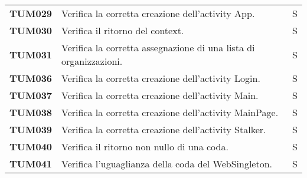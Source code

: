 \documentclass[../../piano-di-qualifica.tex]{subfiles}
\begin{document}
\begin{longtable}[H]{>{\centering\bfseries}m{3cm} >{}m{10cm} >{\centering\arraybackslash}m{3cm}}

  TUM029             & Verifica la corretta creazione dell'activity App.                                                                   & S                             \\ %

  TUM030             & Verifica il ritorno del context.                                                                                    & S                             \\ %

  TUM031             & Verifica la corretta assegnazione di una lista di organizzazioni.                                                   & S                             \\ %


  TUM036             & Verifica la corretta creazione dell'activity Login.                                                                 & S                             \\ %

  TUM037             & Verifica la corretta creazione dell'activity Main.                                                                  & S                             \\ %

  TUM038             & Verifica la corretta creazione dell'activity MainPage.                                                              & S                             \\ %

  TUM039             & Verifica la corretta creazione dell'activity Stalker.                                                               & S                             \\ %

  TUM040             & Verifica il ritorno non nullo di una coda.                                                                          & S                             \\ %

  TUM041             & Verifica l'uguaglianza della coda del WebSingleton.                                                                 & S                             \\ %


\end{longtable}
\end{document}
